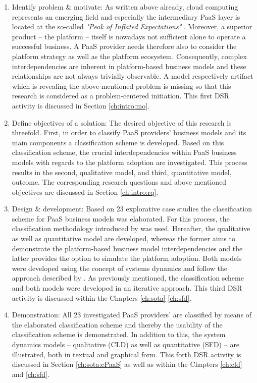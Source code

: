 \begin{enumerate}
	\item Identify problem \& motivate: As written above already, cloud computing represents an emerging field and especially the intermediary \ac{PaaS} layer is located at the so-called \textit{"Peak of Inflated Expectations"} \citep[p. 5]{Smith2012}. Moreover, a superior product -- the platform -- itself is nowadays not sufficient alone to operate a successful business. A \ac{PaaS} provider needs therefore also to consider the platform strategy as well as the platform ecosystem. Consequently, complex interdependencies are inherent in platform-based business models and these relationships are not always trivially observable. A model respectively artifact which is revealing the above mentioned problem is missing so that this research is considered as a problem-centered initiation. This first \ac{DSR} activity is discussed in Section \ref{ch:intro:mo}.
	\item Define objectives of a solution: The desired objective of this research is threefold. First, in order to classify \ac{PaaS} providers' business models and its main components a classification scheme is developed. Based on this classification scheme, the crucial interdependencies within \ac{PaaS} business models with regards to the platform adoption are investigated. This process results in the second, qualitative model, and third, quantitative model, outcome. The corresponding research questions and above mentioned objectives are discussed in Section \ref{ch:intro:rq}.
	\item Design \& development: Based on 23 explorative case studies the classification scheme for \ac{PaaS} business models was elaborated. For this process, the classification methodology introduced by \citet{Fettke2003} was used. Hereafter, the qualitative as well as quantitative model are developed, whereas the former aims to demonstrate the platform-based business model interdependencies and the latter provides the option to simulate the platform adoption. Both models were developed using the concept of systems dynamics and follow the approach described by \citet{Sterman2000}. As previously mentioned, the classification scheme and both models were developed in an iterative approach. This third \ac{DSR} activity is discussed within the Chapters \ref{ch:sota}-\ref{ch:sfd}.
	\item Demonstration: All 23 investigated \ac{PaaS} providers' are classified by means of the elaborated classification scheme and thereby the usability of the classification scheme is demonstrated. In addition to this, the system dynamics models -- qualitative (\ac{CLD}) as well as quantitative (\ac{SFD}) -- are illustrated, both in textual and graphical form. This forth \ac{DSR} activity is discussed in Section \ref{ch:sota:cPaaS} as well as within the Chapters \ref{ch:cld} and \ref{ch:sfd}.

\end{enumerate}
